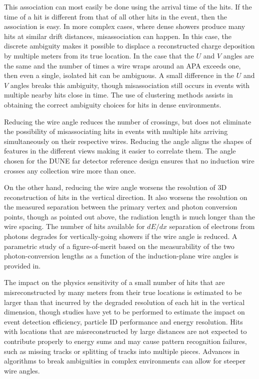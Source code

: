 This association can most easily be done using the arrival time of the
hits.  If the time of a hit is different from that of all other hits
in the event, then the association is easy.  In more complex cases,
where dense showers produce many hits at similar drift distances,
misassociation can happen.  In this case, the discrete ambiguity makes
it possible to displace a reconstructed charge deposition by multiple
meters from its true location.  In the case that the $U$ and $V$
angles are the same and the number of times a wire wraps around an APA
exceeds one, then even a single, isolated hit can be ambiguous.  A
small difference in the $U$ and $V$ angles breaks this ambiguity,
though misassociation still occurs in events with multiple nearby hits
close in time.  The use of clustering methods assists in obtaining the
correct ambiguity choices for hits in dense environments.

Reducing the wire angle reduces the number of crossings, but does not
eliminate the possibility of misassociating hits in events with
multiple hits arriving simultaneously on their respective wires.
Reducing the angle aligns the
shapes of features in the different views making it easier to correlate them.
The angle chosen for the DUNE far detector
reference design ensures that no induction wire crosses any collection
wire more than once.

On the other hand, reducing the wire angle worsens the resolution of
3D reconstruction of hits in the vertical direction. 
It also worsens the resolution on the measured separation between the
primary vertex and photon conversion points, though as pointed out
above, the radiation length is much longer than the wire spacing.  
The number of hits available for $dE/dx$ separation of electrons from
photons degrades for vertically-going showers if the wire angle is
reduced.  A parametric study of a figure-of-merit based on the
measurability of the two photon-conversion lengths as a function of
the induction-plane wire angles is provided
in\cite{wire-orientation}.

The impact on the physics sensitivity of a small number of hits that
are misreconstructed by many meters from their true locations is
estimated to be larger than that incurred by the degraded resolution
of each hit in the vertical dimension\cite{docdb-8981}, though studies
have yet to be performed to estimate the impact on event detection
efficiency, particle ID performance and energy resolution.  Hits with
locations that are misreconstructed by large distances are not
expected to contribute properly to energy sums and may cause pattern
recognition failures, such as missing tracks or splitting of tracks
into multiple pieces.  Advances in algorithms to break ambiguities in
complex environments can allow for steeper wire angles.

